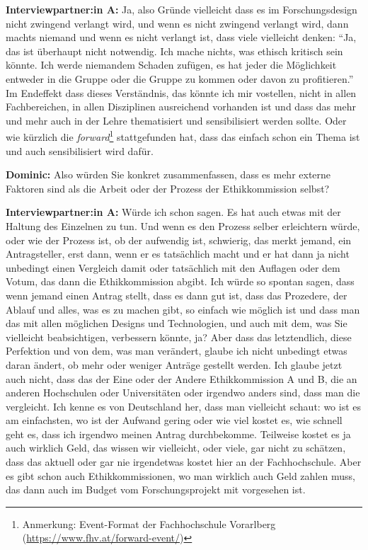 \documentclass[a4paper,12pt,twoside,numbers=noendperiod]{scrreprt}
\begin{document}
\textbf{Interviewpartner:in A:} Ja, also Gründe vielleicht dass es im Forschungsdesign nicht zwingend verlangt wird, und wenn es nicht zwingend verlangt wird, dann machts niemand und wenn es nicht verlangt ist, dass viele vielleicht denken: \enquote{Ja, das ist überhaupt nicht notwendig. Ich mache nichts, was ethisch kritisch sein könnte. Ich werde niemandem Schaden zufügen, es hat jeder die Möglichkeit entweder in die Gruppe oder die Gruppe zu kommen oder davon zu profitieren.} Im Endeffekt dass dieses Verständnis, das könnte ich mir vostellen, nicht in allen Fachbereichen, in allen Disziplinen ausreichend vorhanden ist und dass das mehr und mehr auch in der Lehre thematisiert und sensibilisiert werden sollte. Oder wie kürzlich die \textit{forward}\footnote{Anmerkung: Event-Format der Fachhochschule Vorarlberg (\url{https://www.fhv.at/forward-event/})} stattgefunden hat, dass das einfach schon ein Thema ist und auch sensibilisiert wird dafür.

\textbf{Dominic:} Also würden Sie konkret zusammenfassen, dass es mehr externe Faktoren sind als die Arbeit oder der Prozess der Ethikkommission selbst?

\textbf{Interviewpartner:in A:} Würde ich schon sagen. Es hat auch etwas mit der Haltung des Einzelnen zu tun. Und wenn es den Prozess selber erleichtern würde, oder wie der Prozess ist, ob der aufwendig ist, schwierig, das merkt jemand, ein Antragsteller, erst dann, wenn er es tatsächlich macht und er hat dann ja nicht unbedingt einen Vergleich damit oder tatsächlich mit den Auflagen oder dem Votum, das dann die Ethikkommission abgibt. Ich würde so spontan sagen, dass wenn jemand einen Antrag stellt, dass es dann gut ist, dass das Prozedere, der Ablauf und alles, was es zu machen gibt, so einfach wie möglich ist und dass man das mit allen möglichen Designs und Technologien, und auch mit dem, was Sie vielleicht beabsichtigen, verbessern könnte, ja? Aber dass das letztendlich, diese Perfektion und von dem, was man verändert, glaube ich nicht unbedingt etwas daran ändert, ob mehr oder weniger Anträge gestellt werden. Ich glaube jetzt auch nicht, dass das der Eine oder der Andere Ethikkommission A und B, die an anderen Hochschulen oder Universitäten oder irgendwo anders sind, dass man die vergleicht. Ich kenne es von Deutschland her, dass man vielleicht schaut: wo ist es am einfachsten, wo ist der Aufwand gering oder wie viel kostet es, wie schnell geht es, dass ich irgendwo meinen Antrag durchbekomme. Teilweise kostet es ja auch wirklich Geld, das wissen wir vielleicht, oder viele, gar nicht zu schätzen, dass das aktuell oder gar nie irgendetwas kostet hier an der Fachhochschule. Aber es gibt schon auch Ethikkommissionen, wo man wirklich auch Geld zahlen muss, das dann auch im Budget vom Forschungsprojekt mit vorgesehen ist.
\end{document}
